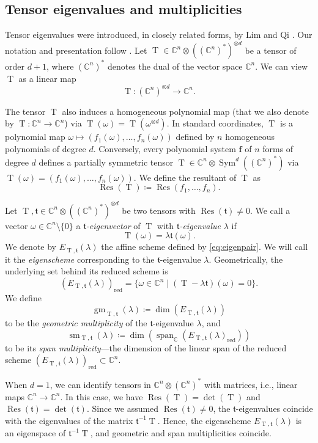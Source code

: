 \documentclass[11pt,letterpaper]{article}
\numberwithin{equation}{section}
\newcommand{\CC}{\mathbb{C}}
\newcommand{\ff}{\ensuremath{\boldsymbol{f}}}
\newcommand{\ft}{\mathfrak{t}}
\DeclareMathOperator{\gm}{gm}
\DeclareMathOperator{\sm}{sm}
\DeclareMathOperator{\Res}{Res}
\DeclareMathOperator{\T}{T}
\DeclareMathOperator{\red}{red}
\begin{document}
\subsection{Tensor eigenvalues and multiplicities}

Tensor eigenvalues were introduced, in closely related forms, by Lim \cite{Lim-05} and  Qi \cite{Qi-05}.
Our notation and presentation follow \cite{GGTV-23,CFGL-26}.
Let $
\T \in \CC^n \otimes \left((\CC^{n})^\ast\right)^{\otimes d}
$ be a tensor of order $d+1$, where $(\CC^n)^\ast$ denotes the dual of the vector space $\CC^n$. 
We can view $\T$ as a linear map
\[
\T: (\CC^n)^{\otimes d}\rightarrow \CC^n.
\] 

The tensor $\T$ also induces a homogeneous polynomial map (that we also denote by $\T:\CC^n\rightarrow\CC^n$) via $\T(\omega) = \T(\omega^{\otimes d})$.
In standard coordinates, $\T$ is a polynomial map $\omega\mapsto (f_1(\omega),\dots,f_n(\omega))$ defined by $n$ homogeneous polynomials of degree $d$.
Conversely, every polynomial system $\ff$ of $n$ forms of degree $d$ defines a partially symmetric tensor $\T\in\CC^n\otimes \operatorname{Sym}^d((\CC^n)^\ast)$ via $\T(\omega)=(f_1(\omega),\dots,f_n(\omega))$.
We define the resultant of $\T$ as \[\Res(\T)\coloneqq\Res(f_1,\dots,f_n).
\] 

Let $\T,\ft\in \CC^n \otimes \left((\CC^{n})^\ast\right)^{\otimes d}$ be two tensors with $\Res(\ft)\neq 0$. 
We call a vector $\omega\in\CC^n\setminus\{0\}$ a \emph{$\ft$-eigenvector} of $\T$ with \emph{$\ft$-eigenvalue} $\lambda$ if \begin{equation}
\label{eq:eigenpair}
\T(\omega) = \lambda \ft(\omega).
\end{equation}
We denote by $E_{\T,\ft}(\lambda)$ the affine scheme defined by \cref{eq:eigenpair}.
We will call it the \emph{eigenscheme} corresponding to the $\ft$-eigenvalue $\lambda$.
Geometrically, the underlying set behind its reduced scheme is \[
\left(E_{\T,\ft}(\lambda)\right)_{\red} = \{\omega\in\CC^n\mid (\T-\lambda\ft)(\omega)=0\}.
\]
We define \[
\gm_{\T,\ft}(\lambda) \coloneqq \dim \left( E_{\T,\ft}(\lambda)\right)
\] to be the \emph{geometric multiplicity} of the $\ft$-eigenvalue $\lambda$, and \[
\sm_{\T,\ft}(\lambda)\coloneqq \dim\left( \operatorname{span}_{\CC}(E_{\T,\ft}(\lambda)_{\red})\right)
\] to be its \emph{span multiplicity}---the dimension of the linear span of the reduced scheme $\left(E_{\T,\ft}(\lambda)\right)_{\red}\subset\CC^{n}$.

When $d=1$, we can identify tensors in $ \CC^n\otimes(\CC^n)^\ast$ with matrices, i.e., linear maps $\CC^n\rightarrow\CC^n$. 
In this case, we have $\Res(\T)=\det(\T)$ and $\Res(\ft)=\det(\ft)$.
Since we assumed $\Res(\ft)\neq 0$, the $\ft$-eigenvalues coincide with the eigenvalues of the matrix $\ft^{-1}\T$.
Hence, the eigenscheme $E_{\T,\ft}(\lambda)$ is an eigenspace of $\ft^{-1}\T$, and geometric and span multiplicities coincide.
\end{document}
